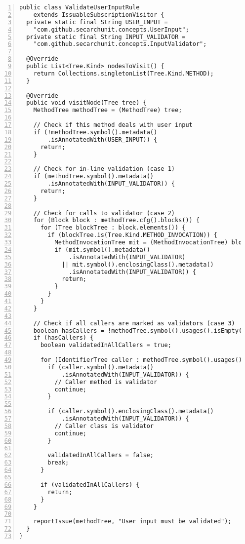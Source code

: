 \begin{lstlisting}[caption={Constraint 4.}, captionpos=b, label=lst:sq_4, numbers=left, showstringspaces=false]
public class ValidateUserInputRule
    extends IssuableSubscriptionVisitor {
  private static final String USER_INPUT =
    "com.github.secarchunit.concepts.UserInput";
  private static final String INPUT_VALIDATOR =
    "com.github.secarchunit.concepts.InputValidator";

  @Override
  public List<Tree.Kind> nodesToVisit() {
    return Collections.singletonList(Tree.Kind.METHOD);
  }

  @Override
  public void visitNode(Tree tree) {
    MethodTree methodTree = (MethodTree) tree;

    // Check if this method deals with user input
    if (!methodTree.symbol().metadata()
        .isAnnotatedWith(USER_INPUT)) {
      return;
    }

    // Check for in-line validation (case 1)
    if (methodTree.symbol().metadata()
        .isAnnotatedWith(INPUT_VALIDATOR)) {
      return;
    }

    // Check for calls to validator (case 2)
    for (Block block : methodTree.cfg().blocks()) {
      for (Tree blockTree : block.elements()) {
        if (blockTree.is(Tree.Kind.METHOD_INVOCATION)) {
          MethodInvocationTree mit = (MethodInvocationTree) blockTree;
          if (mit.symbol().metadata()
              .isAnnotatedWith(INPUT_VALIDATOR)
            || mit.symbol().enclosingClass().metadata()
              .isAnnotatedWith(INPUT_VALIDATOR)) {
            return;
          }
        }
      }
    }

    // Check if all callers are marked as validators (case 3)
    boolean hasCallers = !methodTree.symbol().usages().isEmpty();
    if (hasCallers) {
      boolean validatedInAllCallers = true;

      for (IdentifierTree caller : methodTree.symbol().usages()) {
        if (caller.symbol().metadata()
            .isAnnotatedWith(INPUT_VALIDATOR)) {
          // Caller method is validator
          continue;
        }

        if (caller.symbol().enclosingClass().metadata()
            .isAnnotatedWith(INPUT_VALIDATOR)) {
          // Caller class is validator
          continue;
        }

        validatedInAllCallers = false;
        break;
      }

      if (validatedInAllCallers) {
        return;
      }
    }

    reportIssue(methodTree, "User input must be validated");
  }
}
\end{lstlisting}

